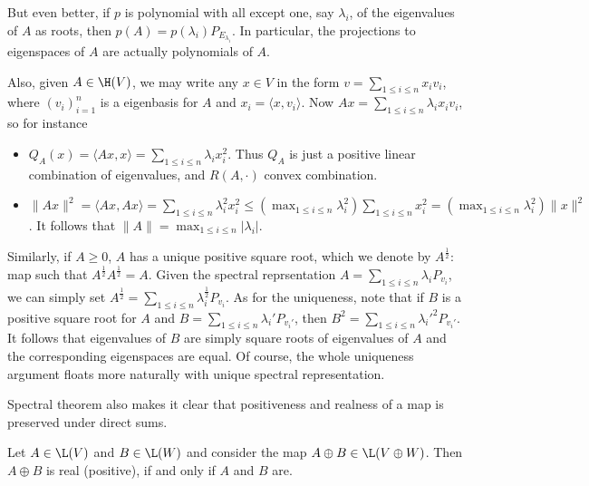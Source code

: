 But even better, if $p$ is polynomial with all except one, say $\lambda_{i}$, of the eigenvalues of $A$ as roots, then $p(A) = p(\lambda_{i}) P_{E_{\lambda_{i}}}$. In particular, the projections to eigenspaces of $A$ are actually polynomials of $A$.

Also, given $A \in \H(V)$, we may write any $x \in V$ in the form $v = \sum_{1 \leq i \leq n} x_{i} v_{i}$, where $(v_{i})_{i = 1}^{n}$ is a eigenbasis for $A$ and $x_{i} = \langle x, v_{i} \rangle$. Now $A x = \sum_{1 \leq i \leq n} \lambda_{i} x_{i} v_{i}$, so for instance

\begin{itemize}
\item $Q_{A}(x) = \langle A x, x \rangle = \sum_{1 \leq i \leq n} \lambda_{i} x_{i}^{2}$. Thus $Q_{A}$ is just a positive linear combination of eigenvalues, and $R(A, \cdot)$ convex combination.
\item $\|A x\|^{2} = \langle A x, A x \rangle = \sum_{1 \leq i \leq n} \lambda_{i}^{2} x_{i}^{2} \leq \left(\max_{1 \leq i \leq n} \lambda_{i}^2 \right) \sum_{1 \leq i \leq n} x_{i}^2 = \left(\max_{1 \leq i \leq n} \lambda_{i}^2 \right) \|x\|^{2}$. It follows that $\|A\| = \max_{1 \leq i \leq n} |\lambda_{i}|$.
\end{itemize}

Similarly, if $A \geq 0$, $A$ has a unique positive square root, which we denote by $A^{\frac{1}{2}}$: map such that $A^{\frac{1}{2}} A^{\frac{1}{2}} = A$. Given the spectral reprsentation $A = \sum_{1 \leq i \leq n} \lambda_{i} P_{v_{i}}$, we can simply set $A^{\frac{1}{2}} = \sum_{1 \leq i \leq n} \lambda_{i}^{\frac{1}{2}} P_{v_{i}}$. As for the uniqueness, note that if $B$ is a positive square root for $A$ and $B = \sum_{1 \leq i \leq n} \lambda_{i}' P_{v_{i}'}$, then $B^2 = \sum_{1 \leq i \leq n} \lambda_{i}'^{2} P_{v_{i}'}$. It follows that eigenvalues of $B$ are simply square roots of eigenvalues of $A$ and the corresponding eigenspaces are equal. Of course, the whole uniqueness argument floats more naturally with unique spectral representation.

Spectral theorem also makes it clear that positiveness and realness of a map is preserved under direct sums.

\begin{kor}
	Let $A \in \L(V)$ and $B \in \L(W)$ and consider the map $A \oplus B \in \L(V \oplus W)$. Then $A \oplus B$ is real (positive), if and only if $A$ and $B$ are.
\end{kor}

